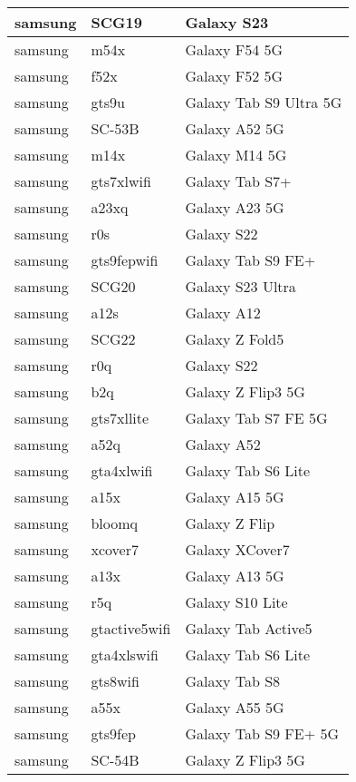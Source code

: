 \begin{tabularx}{\linewidth}{|l|X|X|}
        samsung & SCG19 & Galaxy S23 \\ \hline
        samsung & m54x & Galaxy F54 5G \\ \hline
        samsung & f52x & Galaxy F52 5G \\ \hline
        samsung & gts9u & Galaxy Tab S9 Ultra 5G \\ \hline
        samsung & SC-53B & Galaxy A52 5G \\ \hline
        samsung & m14x & Galaxy M14 5G \\ \hline
        samsung & gts7xlwifi & Galaxy Tab S7+ \\ \hline
        samsung & a23xq & Galaxy A23 5G \\ \hline
        samsung & r0s & Galaxy S22 \\ \hline
        samsung & gts9fepwifi & Galaxy Tab S9 FE+ \\ \hline
        samsung & SCG20 & Galaxy S23 Ultra \\ \hline
        samsung & a12s & Galaxy A12 \\ \hline
        samsung & SCG22 & Galaxy Z Fold5 \\ \hline
        samsung & r0q & Galaxy S22 \\ \hline
        samsung & b2q & Galaxy Z Flip3 5G \\ \hline
        samsung & gts7xllite & Galaxy Tab S7 FE 5G \\ \hline
        samsung & a52q & Galaxy A52 \\ \hline
        samsung & gta4xlwifi & Galaxy Tab S6 Lite \\ \hline
        samsung & a15x & Galaxy A15 5G \\ \hline
        samsung & bloomq & Galaxy Z Flip \\ \hline
        samsung & xcover7 & Galaxy XCover7 \\ \hline
        samsung & a13x & Galaxy A13 5G \\ \hline
        samsung & r5q & Galaxy S10 Lite \\ \hline
        samsung & gtactive5wifi & Galaxy Tab Active5 \\ \hline
        samsung & gta4xlswifi & Galaxy Tab S6 Lite \\ \hline
        samsung & gts8wifi & Galaxy Tab S8 \\ \hline
        samsung & a55x & Galaxy A55 5G \\ \hline
        samsung & gts9fep & Galaxy Tab S9 FE+ 5G \\ \hline
        samsung & SC-54B & Galaxy Z Flip3 5G \\ \hline

\end{tabularx}
